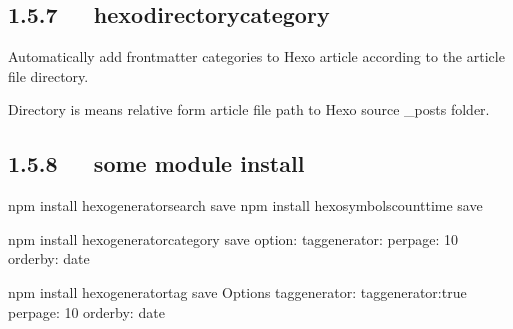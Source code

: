 \documentclass[letterpaper,12pt,english]{sphinxmanual}
\begin{document}
\subsection{1.5.7   hexo\sphinxhyphen{}directory\sphinxhyphen{}category}
\label{\detokenize{001software/001install/001._u7f51_u7ad9/hexo:hexo-directory-category}}
Automatically add front\sphinxhyphen{}matter categories to Hexo article according to the article file directory.

Directory is means relative form article file path to Hexo source \_posts folder.


\begin{sphinxVerbatim}[commandchars=\\\{\}]
   
       
      
       
             
\end{sphinxVerbatim}


\subsection{1.5.8   some module install}
\label{\detokenize{001software/001install/001._u7f51_u7ad9/hexo:some-module-install}}
\begin{sphinxVerbatim}[commandchars=\\\{\}]
\PYGZdl{} npm install hexo\PYGZhy{}generator\PYGZhy{}search \PYGZhy{}\PYGZhy{}save
\PYGZdl{} npm install hexo\PYGZhy{}symbols\PYGZhy{}count\PYGZhy{}time \PYGZhy{}\PYGZhy{}save


\PYGZdl{} npm install hexo\PYGZhy{}generator\PYGZhy{}category \PYGZhy{}\PYGZhy{}save
option:
tag\PYGZus{}generator:
  per\PYGZus{}page: 10
  order\PYGZus{}by: \PYGZhy{}date


\PYGZdl{} npm install hexo\PYGZhy{}generator\PYGZhy{}tag \PYGZhy{}\PYGZhy{}save
Options
tag\PYGZus{}generator:
  tag\PYGZus{}generator:true
  per\PYGZus{}page: 10
  order\PYGZus{}by: \PYGZhy{}date
\end{sphinxVerbatim}
\end{document}
